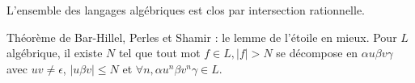 \documentclass[a4paper]{article}
\begin{document}
\begin{prop}
L'ensemble des langages algébriques est clos par intersection rationnelle.
\end{prop}

\begin{prop}
Théorème de Bar-Hillel, Perles et Shamir : le lemme de l'étoile en mieux. Pour $L$ algébrique, il existe $N$ tel que tout mot $f\in L, |f|>N$ se décompose en $\alpha u\beta v\gamma$ avec $uv\neq \epsilon$, $|u\beta v|\leqslant N$ et $\forall n, \alpha u^n\beta v^n\gamma\in L$.
\end{prop}
\end{document}
